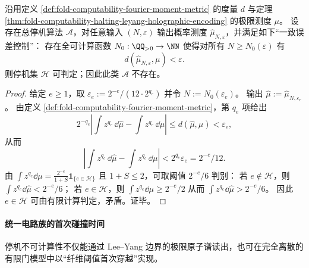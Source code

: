 \begin{corollary}[全息边界的统一误差控制学习不可能]\label{cor:fold-computability-halting-no-uniform-learning}
沿用定义 \ref{def:fold-computability-fourier-moment-metric} 的度量 \(d\) 与定理 \ref{thm:fold-computability-halting-leyang-holographic-encoding} 的极限测度 \(\mu\)。
设存在总停机算法 \(\mathcal A\)，对任意输入 \((N,\varepsilon)\) 输出概率测度 \(\widehat{\mu}_{N,\varepsilon}\)，并满足如下“一致误差控制”：
存在全可计算函数 \(N_0:\QQ_{>0}\to\NN\) 使得对所有 \(N\ge N_0(\varepsilon)\) 有
\[
d(\widehat{\mu}_{N,\varepsilon},\mu)<\varepsilon.
\]
则停机集 \(\mathcal H\) 可判定；因此此类 \(\mathcal A\) 不存在。
\end{corollary}
\begin{proof}
给定 \(e\ge 1\)，取
\(
\varepsilon_e:=2^{-e}/(12\cdot 2^{q_e})
\)
并令 \(N:=N_0(\varepsilon_e)\)。
输出 \(\widehat{\mu}:=\widehat{\mu}_{N,\varepsilon_e}\)。
由定义 \ref{def:fold-computability-fourier-moment-metric}，第 \(q_e\) 项给出
\[
2^{-q_e}\left|\int z^{q_e}\,\dd\widehat{\mu}-\int z^{q_e}\,\dd\mu\right|
\le d(\widehat{\mu},\mu)
<\varepsilon_e,
\]
从而
\[
\left|\int z^{q_e}\,\dd\widehat{\mu}-\int z^{q_e}\,\dd\mu\right|
<2^{q_e}\varepsilon_e
=2^{-e}/12.
\]
由 \(\int z^{q_e}\dd\mu=\frac{2^{-e}}{1+S}\mathbf 1_{\{e\in\mathcal H\}}\) 且 \(1+S\le 2\)，可取阈值 \(2^{-e}/6\) 判别：
若 \(e\notin\mathcal H\)，则 \(\int z^{q_e}\dd\widehat{\mu}<2^{-e}/6\)；
若 \(e\in\mathcal H\)，则 \(\int z^{q_e}\dd\mu\ge 2^{-e}/2\) 从而 \(\int z^{q_e}\dd\widehat{\mu}>2^{-e}/6\)。
因此 \(e\in\mathcal H\) 可由有限计算判定，矛盾。证毕。
\end{proof}

\paragraph{统一电路族的首次碰撞时间}
停机不可计算性不仅能通过 Lee--Yang 边界的极限原子谱读出，也可在完全离散的有限门模型中以“纤维阈值首次穿越”实现。

